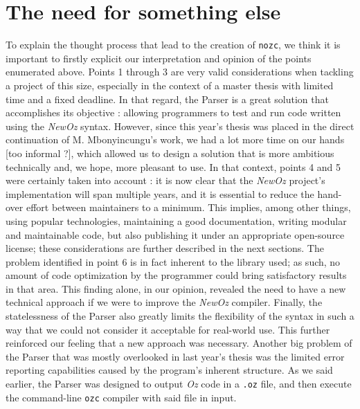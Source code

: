 \section{The need for something else}\label{sec:ch3-problems}
To explain the thought process that lead to the creation of \texttt{nozc}, we think it is important to firstly explicit our interpretation and opinion of the points enumerated above.
Points 1 through 3 are very valid considerations when tackling a project of this size, especially in the context of a master thesis with limited time and a fixed deadline.
In that regard, the Parser is a great solution that accomplishes its objective : allowing programmers to test and run code written using the \textit{NewOz} syntax.\newline
However, since this year's thesis was placed in the direct continuation of M. Mbonyincungu's work, we had a lot more time on our hands [too informal ?], which allowed us to design a solution that is more ambitious technically and, we hope, more pleasant to use.
In that context, points 4 and 5 were certainly taken into account : it is now clear that the \textit{NewOz} project's implementation will span multiple years, and it is essential to reduce the hand-over effort between maintainers to a minimum.
This implies, among other things, using popular technologies, maintaining a good documentation, writing modular and maintainable code, but also publishing it under an appropriate open-source license;
these considerations are further described in the next sections.\newline
The problem identified in point 6 is in fact inherent to the library used;
as such, no amount of code optimization by the programmer could bring satisfactory results in that area.
This finding alone, in our opinion, revealed the need to have a new technical approach if we were to improve the \textit{NewOz} compiler.\newline
Finally, the statelessness of the Parser also greatly limits the flexibility of the syntax in such a way that we could not consider it acceptable for real-world use.
This further reinforced our feeling that a new approach was necessary.\newline
Another big problem of the Parser that was mostly overlooked in last year's thesis was the limited error reporting capabilities caused by the program's inherent structure.
As we said earlier, the Parser was designed to output \textit{Oz} code in a \texttt{.oz} file, and then execute the command-line \texttt{ozc} compiler with said file in input.
